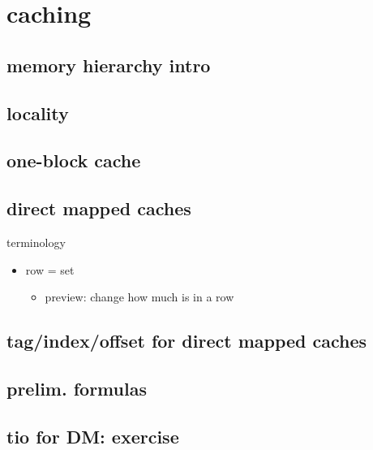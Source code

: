 \section{caching}

\subsection{memory hierarchy intro}


\subsection{locality}


\subsection{one-block cache}


\subsection{direct mapped caches}


\begin{frame}{terminology}
    \begin{itemize}
    \item row = set
        \begin{itemize}
        \item preview: change how much is in a row
        \end{itemize}
    \end{itemize}
\end{frame}

\subsection{tag/index/offset for direct mapped caches}


\subsection{prelim. formulas}


\subsection{tio for DM: exercise}


